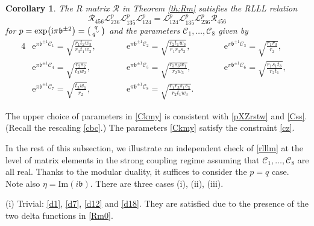 \documentclass[pdftex]{sigma}
\newcommand{\bb}{{\mathfrak b}}
\newcommand{\e}{{\mathrm e}}
\numberwithin{equation}{section}
\newtheorem{Corollary}[Theorem]{Corollary}
\begin{document}
\begin{Corollary}\label{co:mod}
 The $R$ matrix $\mathcal{R}$ in Theorem {\rm\ref{th:Rm}} satisfies the RLLL relation
 \begin{equation}
 \mathcal{R}_{456} \mathcal{L}^p_{236} \mathcal{L}^p_{135} \mathcal{L}^p_{124}
 = \mathcal{L}^p_{124} \mathcal{L}^p_{135} \mathcal{L}^p_{236}\mathcal{R}_{456}
 \label{rlllm}
 \end{equation}
 for
 $p = \exp\bigl({\rm i}\pi \bb^{\pm 2}\bigr) = \left(\begin{smallmatrix}q \\
 q^\vee \end{smallmatrix}\right)$ and the parameters $\mathcal{C}_1,
 \dotsc, \mathcal{C}_8$ given by
 \begin{alignat}{4}
& \e^{\pi \bb^{\pm 1} {\mathcal C}_1} = \sqrt{\frac{r_1 t_2 w_3}{r_3 t_1 w_2}}, \qquad&&
 \e^{\pi \bb^{\pm 1} {\mathcal C}_2} = \sqrt{\frac{r_2 t_1 w_3}{r_1 r_3 s_2}}, \qquad&&
 \e^{\pi \bb^{\pm 1} {\mathcal C}_3} = \sqrt{\frac{r_1 r_3}{r_2}}, &\nonumber
 \\
& \e^{\pi \bb^{\pm 1} {\mathcal C}_4} = \sqrt{\frac{r_2 s_2}{t_2 w_2}},\qquad&&
 \e^{\pi \bb^{\pm 1} {\mathcal C}_5} = \sqrt{\frac{r_3 s_3 w_1}{r_2 w_3}}, \qquad&&
 \e^{\pi \bb^{\pm 1} {\mathcal C}_6} = \sqrt{\frac{r_1 s_1 t_3}{r_2 t_1}},&\nonumber
 \\
 &\e^{\pi \bb^{\pm 1} {\mathcal C}_7} = \sqrt{\frac{t_3 w_1}{r_2}}, \qquad&&
 \e^{\pi \bb^{\pm 1} {\mathcal C}_8} = \sqrt{\frac{r_1 r_3 s_1 s_3}{r_2 t_1 w_3}}.\qquad &&&\label{Ckmy}
 \end{alignat}
\end{Corollary}
The upper choice of parameters in \eqref{Ckmy} is consistent with
\eqref{pXZrstw} and \eqref{Css}. (Recall the rescaling \eqref{cbc}.)
The parameters \eqref{Ckmy} satisfy the constraint \eqref{cz}.

 In the rest of this subsection, we illustrate an independent check of \eqref{rlllm} at the level of matrix elements
 in the strong coupling regime
 assuming that ${\mathcal C}_1,\ldots, {\mathcal C}_8$ are all real.
 Thanks to the modular duality, it suffices to consider the $p=q$ case.
 Note also $\eta = \mathrm{Im}(i \bb)$.
 There are three cases (i), (ii), (iii).

 (i) Trivial: \eqref{d1}, \eqref{d7}, \eqref{d12} and \eqref{d18}.
 They are satisfied due to the presence of the two delta functions in
 \eqref{Rm0}.
\end{document}
